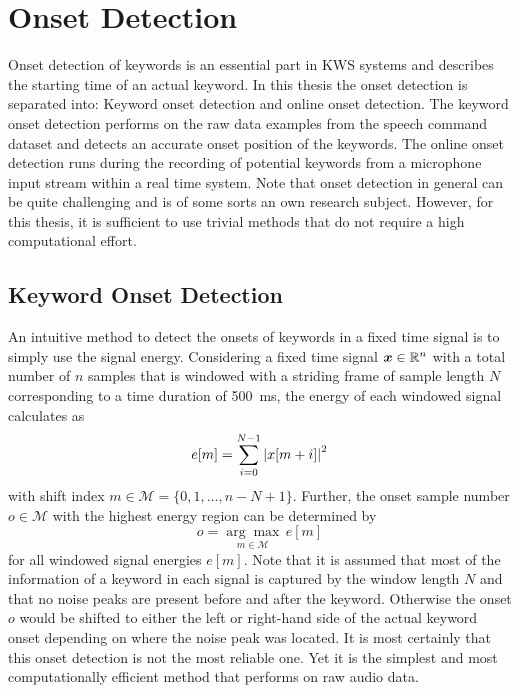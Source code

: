
\section{Onset Detection}\label{sec:signal_onset}
Onset detection of keywords is an essential part in KWS systems and describes the starting time of an actual keyword.
In this thesis the onset detection is separated into: Keyword onset detection and online onset detection.
The keyword onset detection performs on the raw data examples from the speech command dataset and detects an accurate onset position of the keywords.
The online onset detection runs during the recording of potential keywords from a microphone input stream within a real time system.
Note that onset detection in general can be quite challenging and is of some sorts an own research subject.
However, for this thesis, it is sufficient to use trivial methods that do not require a high computational effort.



\subsection{Keyword Onset Detection}\label{sec:signal_onset_kw}
An intuitive method to detect the onsets of keywords in a fixed time signal is to simply use the signal energy.
Considering a fixed time signal $\bm{x} \in \mathbb{R}^n$ with a total number of $n$ samples that is windowed with a striding frame of sample length $N$ corresponding to a time duration of \SI{500}{\milli\second}, the energy of each windowed signal calculates as
\begin{equation}\label{eq:e_win}
  e[m] = \sum_{i=0}^{N-1} \abs{x[m + i]}^2
\end{equation}
with shift index $m \in \mathcal{M} = \{0, 1, \dots, n - N + 1\}$.
Further, the onset sample number $o \in \mathcal{M}$ with the highest energy region can be determined by
\begin{equation}\label{eq:onset}
  o = \underset{m \in \mathcal{M}}{\arg \max} \, e[m]
\end{equation}
for all windowed signal energies $e[m]$.
Note that it is assumed that most of the information of a keyword in each signal is captured by the window length $N$ and that no noise peaks are present before and after the keyword. 
Otherwise the onset $o$ would be shifted to either the left or right-hand side of the actual keyword onset depending on where the noise peak was located.
It is most certainly that this onset detection is not the most reliable one. 
Yet it is the simplest and most computationally efficient method that performs on raw audio data.

